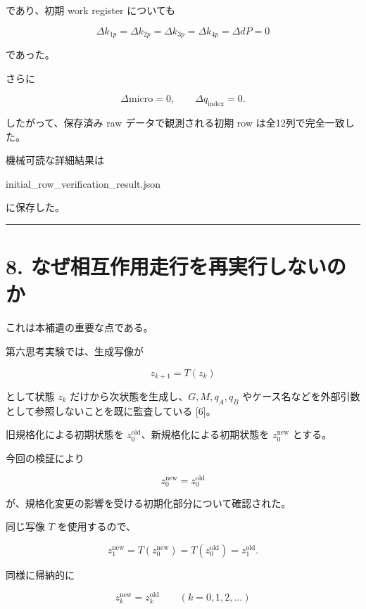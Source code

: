 \documentclass[
  a4paper,
]{ltjsarticle}
\newenvironment{Shaded}{}{}
\newcommand{\NormalTok}[1]{#1}
\begin{document}
であり、初期 work register についても

\[
\boxed{
\Delta k_{1p}=
\Delta k_{2p}=
\Delta k_{3p}=
\Delta k_{4p}=
\Delta dP=0
}
\]

であった。

さらに

\[
\Delta \mathrm{micro}=0,
\qquad
\Delta q_{\mathrm{index}}=0.
\]

したがって、保存済み raw データで観測される初期 row
は全12列で完全一致した。

機械可読な詳細結果は

\begin{Shaded}
\begin{Highlighting}[]
\NormalTok{initial\_row\_verification\_result.json}
\end{Highlighting}
\end{Shaded}

に保存した。

\begin{center}\rule{0.5\linewidth}{0.5pt}\end{center}

\section{8.
なぜ相互作用走行を再実行しないのか}\label{ux306aux305cux76f8ux4e92ux4f5cux7528ux8d70ux884cux3092ux518dux5b9fux884cux3057ux306aux3044ux306eux304b}

これは本補遺の重要な点である。

第六思考実験では、生成写像が

\[
z_{k+1}=T(z_k)
\]

として状態 \(z_k\) だけから次状態を生成し、\(G,M,q_A,q_B\)
やケース名などを外部引数として参照しないことを既に監査している {[}6{]}。

旧規格化による初期状態を
\(z_0^{\mathrm{old}}\)、新規格化による初期状態を \(z_0^{\mathrm{new}}\)
とする。

今回の検証により

\[
\boxed{
z_0^{\mathrm{new}}=z_0^{\mathrm{old}}
}
\]

が、規格化変更の影響を受ける初期化部分について確認された。

同じ写像 \(T\) を使用するので、

\[
z_1^{\mathrm{new}}
=T(z_0^{\mathrm{new}})
=T(z_0^{\mathrm{old}})
=z_1^{\mathrm{old}}.
\]

同様に帰納的に

\[
\boxed{
z_k^{\mathrm{new}}=z_k^{\mathrm{old}}
\qquad (k=0,1,2,\ldots)
}
\]
\end{document}
